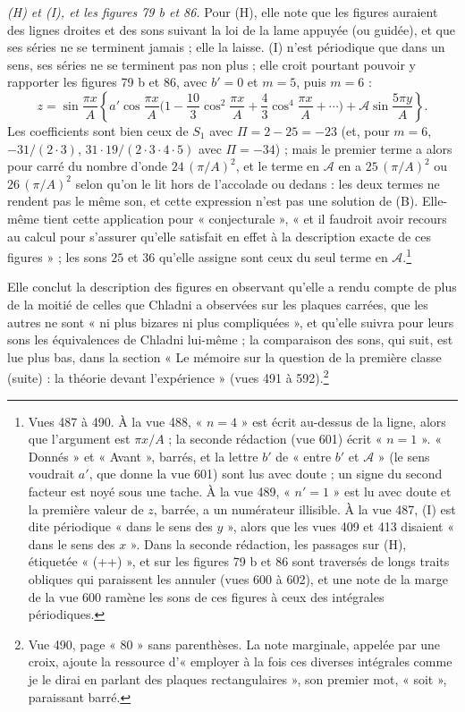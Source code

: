 \documentclass[11pt,a4paper]{article}
\begin{document}
\emph{(H) et (I), et les figures 79 b et 86.} Pour (H), elle note que les figures
auraient des lignes droites et des sons suivant la loi de la lame appuyée (ou guidée),
et que ses séries ne se terminent jamais ; elle la laisse. (I) n'est périodique que
dans un sens, ses séries ne se terminent pas non plus ; elle croit pourtant pouvoir y
rapporter les figures 79 b et 86, avec $b' = 0$ et $m = 5$, puis $m = 6$ :
\[
z = \sin\frac{\pi x}{A}\left\{a'\cos\frac{\pi x}{A}\Big(1 - \frac{10}{3}\cos^2\frac{\pi x}{A} + \frac43\cos^4\frac{\pi x}{A} + \cdots\Big) + \mathcal{A}\sin\frac{5\pi y}{A}\right\}.
\]
Les coefficients sont bien ceux de $S_1$ avec $\Pi = 2 - 25 = -23$ (et, pour $m = 6$,
$-31/(2\cdot3)$, $31\cdot19/(2\cdot3\cdot4\cdot5)$ avec $\Pi = -34$) ; mais le premier
terme a alors pour carré du nombre d'onde $24\,(\pi/A)^2$, et le terme en
$\mathcal{A}$ en a $25\,(\pi/A)^2$ ou $26\,(\pi/A)^2$ selon qu'on le lit hors de
l'accolade ou dedans : les deux termes ne rendent pas le même son, et cette expression
n'est pas une solution de (B). Elle-même tient cette application pour « conjecturale »,
« et il faudroit avoir recours au calcul pour s'assurer qu'elle satisfait en effet à la
description exacte de ces figures » ; les sons $25$ et $36$ qu'elle assigne sont ceux
du seul terme en $\mathcal{A}$.\footnote{Vues 487 à 490. À la vue 488, « $n = 4$ » est
écrit au-dessus de la ligne, alors que l'argument est $\pi x/A$ ; la seconde rédaction
(vue 601) écrit « $n = 1$ ». « Donnés » et « Avant », barrés, et la lettre $b'$ de
« entre $b'$ et $\mathcal{A}$ » (le sens voudrait $a'$, que donne la vue 601) sont lus
avec doute ; un signe du second facteur est noyé sous une tache. À la vue 489,
« $n' = 1$ » est lu avec doute et la première valeur de $z$, barrée, a un numérateur
illisible. À la vue 487, (I) est dite périodique « dans le sens des $y$ », alors que
les vues 409 et 413 disaient « dans le sens des $x$ ». Dans la seconde rédaction, les
passages sur (H), étiquetée « (++) », et sur les figures 79 b et 86 sont traversés de
longs traits obliques qui paraissent les annuler (vues 600 à 602), et une note de la
marge de la vue 600 ramène les sons de ces figures à ceux des intégrales
périodiques.}

Elle conclut la description des figures en observant qu'elle a rendu compte de plus
de la moitié de celles que Chladni a observées sur les plaques carrées, que les autres
ne sont « ni plus bizares ni plus compliquées », et qu'elle suivra pour leurs sons
les équivalences de Chladni lui-même ; la comparaison des sons, qui suit, est lue
plus bas, dans la section « Le mémoire sur la question de la première classe
(suite) : la théorie devant l'expérience » (vues 491 à 592).\footnote{Vue 490, page « 80 » sans
parenthèses. La note marginale, appelée par une croix, ajoute la ressource
d'« employer à la fois ces diverses intégrales comme je le dirai en parlant des plaques
rectangulaires », son premier mot, « soit », paraissant barré.}
\end{document}
